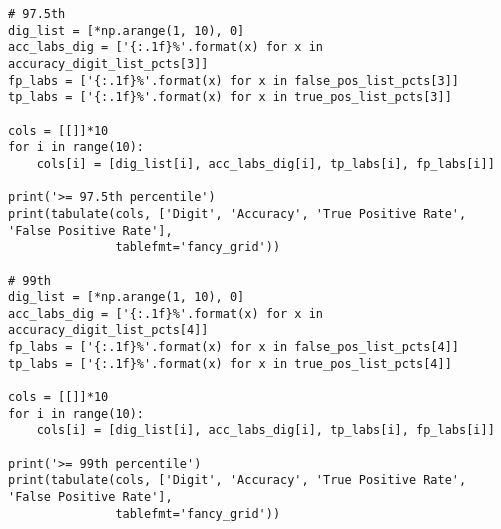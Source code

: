 \documentclass[10pt]{article}
\begin{document}
\begin{lstlisting}
# 97.5th
dig_list = [*np.arange(1, 10), 0]
acc_labs_dig = ['{:.1f}%'.format(x) for x in accuracy_digit_list_pcts[3]]
fp_labs = ['{:.1f}%'.format(x) for x in false_pos_list_pcts[3]]
tp_labs = ['{:.1f}%'.format(x) for x in true_pos_list_pcts[3]]

cols = [[]]*10
for i in range(10):
    cols[i] = [dig_list[i], acc_labs_dig[i], tp_labs[i], fp_labs[i]]

print('>= 97.5th percentile')
print(tabulate(cols, ['Digit', 'Accuracy', 'True Positive Rate', 'False Positive Rate'],
               tablefmt='fancy_grid'))

# 99th 
dig_list = [*np.arange(1, 10), 0]
acc_labs_dig = ['{:.1f}%'.format(x) for x in accuracy_digit_list_pcts[4]]
fp_labs = ['{:.1f}%'.format(x) for x in false_pos_list_pcts[4]]
tp_labs = ['{:.1f}%'.format(x) for x in true_pos_list_pcts[4]]

cols = [[]]*10
for i in range(10):
    cols[i] = [dig_list[i], acc_labs_dig[i], tp_labs[i], fp_labs[i]]

print('>= 99th percentile')
print(tabulate(cols, ['Digit', 'Accuracy', 'True Positive Rate', 'False Positive Rate'],
               tablefmt='fancy_grid'))

\end{lstlisting}
\end{document}
